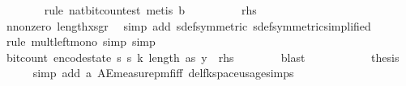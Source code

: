 \begin{isabellebody}
\ \ \ \ \ \ \isamarkupfalse%
\ {\isacharparenleft}{\kern0pt}rule\ nat{\isacharunderscore}{\kern0pt}bit{\isacharunderscore}{\kern0pt}count{\isacharunderscore}{\kern0pt}est{\isacharcomma}{\kern0pt}\ metis\ b{}{\isacharparenright}{\kern0pt}\isanewline
\ \ \ \ \isamarkupfalse%
\ \isamarkupfalse%
\ {\isachardoublequoteopen}{\isachardot}{\kern0pt}{\isachardot}{\kern0pt}{\isachardot}{\kern0pt}\ {\isasymle}\ {\isacharquery}{\kern0pt}rhs{\isachardoublequoteclose}\isanewline
\ \ \ \ \ \ \isamarkupfalse%
\ n{\isacharunderscore}{\kern0pt}nonzero\ length{\isacharunderscore}{\kern0pt}xs{\isacharunderscore}{\kern0pt}gr{\isacharunderscore}{\kern0pt}{}\ \isamarkupfalse%
\ {\isacharparenleft}{\kern0pt}simp\ add{\isacharcolon}{\kern0pt}\ sdef{\isacharbrackleft}{\kern0pt}symmetric{\isacharbrackright}{\kern0pt}\ sdef{\isacharbrackleft}{\kern0pt}symmetric{\isacharcomma}{\kern0pt}simplified{\isacharbrackright}{\kern0pt}{\isacharparenright}{\kern0pt}\isanewline
\ \ \ \ \ \ \isamarkupfalse%
\ {\isacharparenleft}{\kern0pt}rule\ mult{\isacharunderscore}{\kern0pt}left{\isacharunderscore}{\kern0pt}mono{\isacharcomma}{\kern0pt}\ simp{\isacharcomma}{\kern0pt}\ simp{\isacharparenright}{\kern0pt}\isanewline
\ \ \ \ \isamarkupfalse%
\ \isamarkupfalse%
\ {\isachardoublequoteopen}bit{\isacharunderscore}{\kern0pt}count\ {\isacharparenleft}{\kern0pt}encode{\isacharunderscore}{\kern0pt}state\ {\isacharparenleft}{\kern0pt}s\ s\ k{\isacharcomma}{\kern0pt}\ length\ as{\isacharcomma}{\kern0pt}\ y{\isacharparenright}{\kern0pt}{\isacharparenright}{\kern0pt}\ {\isasymle}\ {\isacharquery}{\kern0pt}rhs{\isachardoublequoteclose}\isanewline
\ \ \ \ \ \ \isamarkupfalse%
\ blast\isanewline
\ \ \isamarkupfalse%
\isanewline
\ \ \ \ \isanewline
\ \ \isamarkupfalse%
\ {\isacharquery}{\kern0pt}thesis\isanewline
\ \ \ \ \isamarkupfalse%
\ {\isacharparenleft}{\kern0pt}simp\ add{\isacharcolon}{\kern0pt}\ a\ AE{\isacharunderscore}{\kern0pt}measure{\isacharunderscore}{\kern0pt}pmf{\isacharunderscore}{\kern0pt}iff\ del{\isacharcolon}{\kern0pt}fk{\isacharunderscore}{\kern0pt}space{\isacharunderscore}{\kern0pt}usage{\isachardot}{\kern0pt}simps{\isacharparenright}{\kern0pt}\isanewline
\ \ \ \ \isamarkupfalse%

\end{isabellebody}
